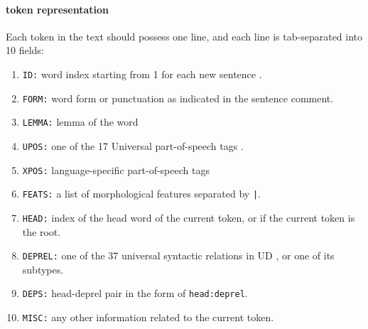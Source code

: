 \paragraph{token representation} 
Each token  in the text should possess one line, and each line is tab-separated into 10 fields:
\begin{enumerate}
	\item \texttt{ID:} word index starting from 1 for each new sentence .
	\item \texttt{FORM:} word form or punctuation as indicated in the sentence comment.
	\item \texttt{LEMMA:} lemma of the word
	\item \texttt{UPOS:} one of the 17 Universal part-of-speech tags .
	\item \texttt{XPOS:} language-specific part-of-speech tags
	\item \texttt{FEATS:} a list of morphological features  separated by \texttt{|}.
	\item \texttt{HEAD:} index of the head word of the current token, or  if the current token is the root.
	\item \texttt{DEPREL:} one of the 37 universal syntactic relations in UD , or one of its subtypes.
	\item \texttt{DEPS:} head-deprel pair in the form of \texttt{head:deprel}.
	\item \texttt{MISC:} any other information related to the current token.
\end{enumerate}
